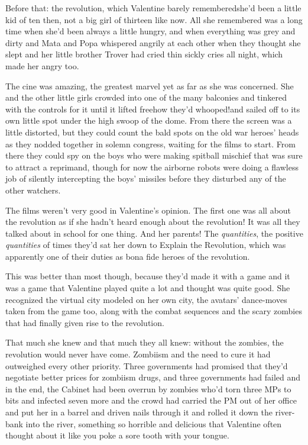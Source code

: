 Before that: the revolution, which Valentine barely
re\-mem\-bered\dash{}she’d been a little kid of ten then, not a big girl of
thirteen like now. All she remembered was a long time when she’d
been always a little hungry, and when everything was grey and dirty
and Mata and Popa whispered angrily at each other when they thought
she slept and her little brother Trover had cried thin sickly cries
all night, which made her angry too.

The cine was amazing, the greatest marvel yet as far as she was
concerned. She and the other little girls crowded into one of the
many balconies and tinkered with the controls for it until it
lifted free\dash{}how they’d whooped!\dash{}and sailed off to its own little
spot under the high swoop of the dome. From there the screen was a
little distorted, but they could count the bald spots on the old
war heroes’ heads as they nodded together in solemn congress,
waiting for the films to start. From there they could spy on the
boys who were making spitball mischief that was sure to attract a
reprimand, though for now the airborne robots were doing a flawless
job of silently intercepting the boys’ missiles before they
disturbed any of the other watchers.

The films weren’t very good in Valentine’s opinion. The first one
was all about the revolution as if she hadn’t heard enough about
the revolution! It was all they talked about in school for one
thing. And her parents! The \emph{quantities}, the positive
\emph{quantities} of times they’d sat her down to Explain the
Revolution, which was apparently one of their duties as bona fide
heroes of the revolution.

This was better than most though, because they’d made it with a
game and it was a game that Valentine played quite a lot and
thought was quite good. She recognized the virtual city modeled on
her own city, the avatars’ dance-moves taken from the game too,
along with the combat sequences and the scary zombies that had
finally given rise to the revolution.

That much she knew and that much they all knew: without the
zombies, the revolution would never have come. Zombiism and the
need to cure it had outweighed every other priority. Three
governments had promised that they’d negotiate better prices for
zombiism drugs, and three governments had failed and in the end,
the Cabinet had been overrun by zombies who’d torn three MPs to
bits and infected seven more and the crowd had carried the PM out
of her office and put her in a barrel and driven nails through it
and rolled it down the river-bank into the river, something so
horrible and delicious that Valentine often thought about it like
you poke a sore tooth with your tongue.

